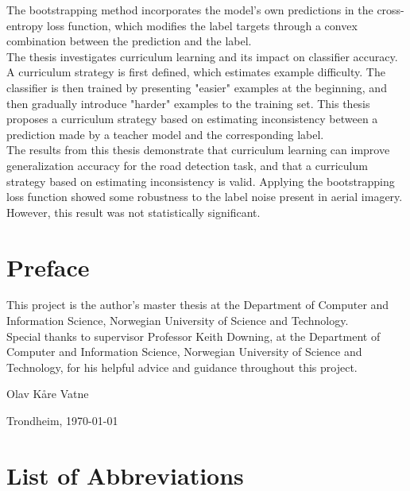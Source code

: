 \documentclass[a4paper]{book}
\newcommand{\thesisAuthor}{Olav Kåre Vatne}
\begin{document}
The bootstrapping method incorporates the model's  own predictions in the cross-entropy loss function, which modifies the label targets through a convex combination between the prediction and the label.\\

The thesis investigates curriculum learning and its impact on classifier accuracy. A curriculum strategy is first defined, which estimates example difficulty. The classifier is then trained by presenting "easier" examples at the beginning, and then gradually introduce "harder" examples to the training set. This thesis proposes a curriculum strategy based on estimating inconsistency between a prediction made by a teacher model and the corresponding label.\\

The results from this thesis demonstrate that curriculum learning can improve generalization accuracy for the road detection task, and that a curriculum strategy based on estimating inconsistency is valid. Applying the bootstrapping loss function showed some robustness to the label noise present in aerial imagery. However, this result was not statistically significant.

\clearpage

\section*{Preface}
\vspace{1cm}

This project is the author's master thesis at the Department of Computer and Information
Science, Norwegian University of Science and Technology. \\

Special thanks to supervisor Professor Keith Downing, at the Department of Computer
and Information Science, Norwegian University of Science and Technology, for his
helpful advice and guidance throughout this project. \\



\vfill

\hfill \thesisAuthor

\hfill Trondheim, \today

\clearpage

\section*{List of Abbreviations}
\vspace{1cm}
\begin{acronym}
\end{acronym}
\end{document}
